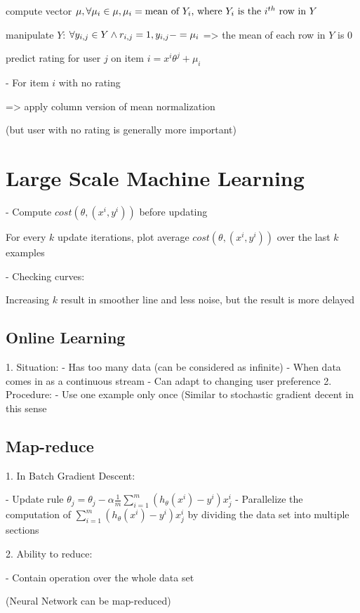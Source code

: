 	compute vector $\mu, \space \forall \mu_i \in \mu, \mu_i = \text{mean of $Y_i$, where $Y_i$ is the $i^{th}$ row in $Y$}$ 

	manipulate $Y$: $\forall y_{i,j} \in Y \land r_{i,j}=1, \space y_{i,j} -= \mu_i$  => the mean of each row in $Y$ is $0$ 

	predict rating for user $j$ on item $i = x^i\theta^j + \mu_i$ 

- For item $i$ with no rating

=> apply column version of mean normalization

(but user with no rating is generally more important)

\section{Large Scale Machine Learning}

- Compute $cost(\theta,(x^i,y^i))$ before updating 

For every $k$ update iterations, plot average $cost(\theta,(x^i,y^i))$ over the last $k$ examples

- Checking curves:

Increasing $k$ result in smoother line and less noise, but the result is more delayed

\subsection{Online Learning}

1. Situation:
- Has too many data (can be considered as infinite)
- When data comes in as a continuous stream
- Can adapt to changing user preference
2. Procedure:
- Use one example only once (Similar to stochastic gradient decent in this sense

\subsection{Map-reduce}

1. In Batch Gradient Descent:

- Update rule $\displaystyle \theta_j = \theta_j - \alpha \frac 1 m \sum^m_{i=1} (h_\theta(x^i)-y^i)x_j^i$ 
- Parallelize the computation of $\displaystyle \sum^m_{i=1} (h_\theta(x^i)-y^i)x_j^i$ by dividing the data set into multiple sections

2. Ability to reduce:

- Contain operation over the whole data set

(Neural Network can be map-reduced)



